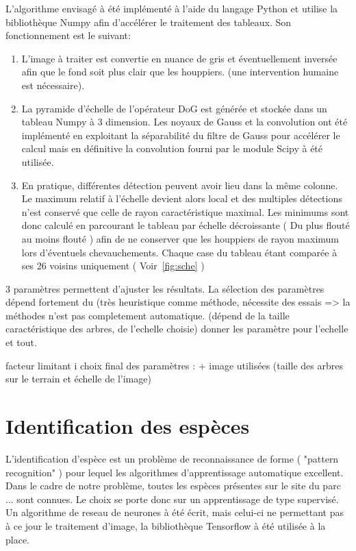 \documentclass{article}
\begin{document}
	L'algorithme envisagé à été implémenté à l'aide du langage Python et utilise la bibliothèque Numpy afin d'accélérer le traitement des tableaux. Son fonctionnement est le suivant:

	\begin{enumerate}
	\item L'image à traiter est convertie en nuance de gris et éventuellement inversée afin que le fond soit plus clair que les houppiers. (une intervention humaine est nécessaire). 
	\item La pyramide d'échelle de l'opérateur DoG est générée et stockée dans un tableau Numpy à 3 dimension. Les noyaux de Gauss et la convolution ont été implémenté en exploitant la séparabilité du filtre de Gauss pour accélérer le calcul mais en définitive la convolution fourni par le module Scipy à été utilisée.  
	\item En pratique, différentes détection peuvent avoir lieu dans la même colonne. Le maximum relatif à l'échelle devient alors local et des multiples détections n'est conservé que celle de rayon caractéristique maximal. 
	Les minimums sont donc calculé en parcourant le tableau par échelle décroissante ( Du plus flouté au moins flouté ) afin de ne conserver que les houppiers de rayon maximum lors d'éventuels chevauchements. Chaque case du tableau étant comparée à ses 26 voisins uniquement ( Voir~\ref{fig:sche} ) 
	\end{enumerate}

	3 paramètres permettent d'ajuster les résultats. La sélection des paramètres dépend fortement du (très heuristique comme méthode, nécessite des essais => la méthodes n'est pas completement automatique. (dépend de la taille caractéristique des arbres, de l'echelle choisie) donner les paramètre pour l'echelle et tout.

		facteur limitant i
		choix final des paramètres : + image utilisées (taille des arbres sur le terrain et échelle de l'image) 


\section{Identification des espèces}

	L'identification d'espèce est un problème de reconnaissance de forme ( "pattern recognition" ) pour lequel les algorithmes d'apprentissage automatique excellent. 
	Dans le cadre de notre problème, toutes les espèces présentes sur le site du parc ... sont connues. Le choix se porte donc sur un apprentissage de type supervisé.
	Un algorithme de reseau de neurones à été écrit, mais celui-ci ne permettant pas à ce jour le traitement d'image, la bibliothèque Tensorflow à été utilisée à la place.
\end{document}
